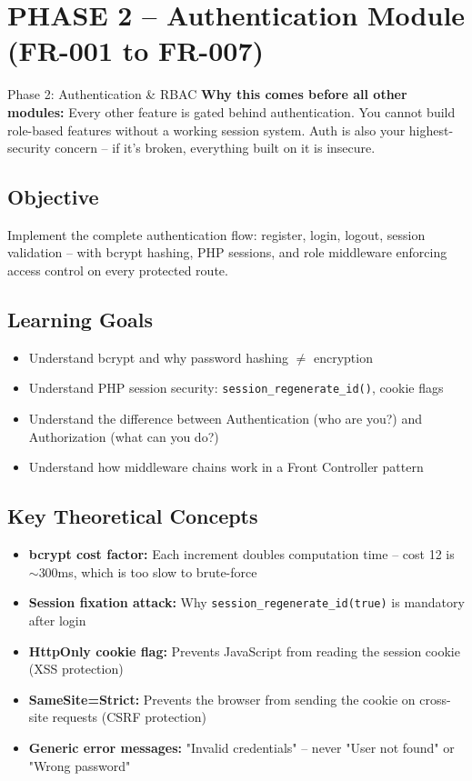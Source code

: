 \documentclass[11pt,a4paper]{report}
\begin{document}
\chapter{PHASE 2 -- Authentication Module (FR-001 to FR-007)}

\begin{phasebox}{Phase 2: Authentication \& RBAC}
\textbf{Why this comes before all other modules:} Every other feature is gated behind authentication. You cannot build role-based features without a working session system. Auth is also your highest-security concern -- if it's broken, everything built on it is insecure.
\end{phasebox}

\section*{Objective}
Implement the complete authentication flow: register, login, logout, session validation -- with bcrypt hashing, PHP sessions, and role middleware enforcing access control on every protected route.

\section*{Learning Goals}
\begin{itemize}
    \item Understand bcrypt and why password hashing $\neq$ encryption
    \item Understand PHP session security: \texttt{session\_regenerate\_id()}, cookie flags
    \item Understand the difference between Authentication (who are you?) and Authorization (what can you do?)
    \item Understand how middleware chains work in a Front Controller pattern
\end{itemize}

\section*{Key Theoretical Concepts}
\begin{itemize}
    \item \textbf{bcrypt cost factor:} Each increment doubles computation time -- cost 12 is $\sim$300ms, which is too slow to brute-force
    \item \textbf{Session fixation attack:} Why \texttt{session\_regenerate\_id(true)} is mandatory after login
    \item \textbf{HttpOnly cookie flag:} Prevents JavaScript from reading the session cookie (XSS protection)
    \item \textbf{SameSite=Strict:} Prevents the browser from sending the cookie on cross-site requests (CSRF protection)
    \item \textbf{Generic error messages:} "Invalid credentials" -- never "User not found" or "Wrong password"
\end{itemize}
\end{document}
